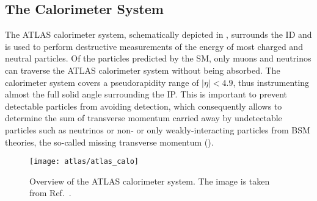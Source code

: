 \subsection{The Calorimeter System}%
\label{sec:atlas_calorimeters}


The ATLAS calorimeter system, schematically depicted in
, surrounds the ID and is used to perform
destructive measurements of the energy of most charged and neutral particles. Of
the particles predicted by the SM, only muons and neutrinos can traverse the
ATLAS calorimeter system without being absorbed. The calorimeter system covers a
pseudorapidity range of $|\eta| < 4.9$, thus instrumenting almost the full solid
angle surrounding the IP. This is important to prevent detectable particles from
avoiding detection, which consequently allows to determine the sum of transverse
momentum carried away by undetectable particles such as neutrinos or non- or
only weakly-interacting particles from BSM theories, the so-called missing
transverse momentum ().


\begin{figure}[htbp]
  \centering

  \texttt{[image: atlas/atlas\_calo]}

  \caption[Overview of the ATLAS calorimeter system.]{Overview of the ATLAS
    calorimeter system. The image is taken from Ref.~\cite{PERF-2007-01}.}%
  \label{fig:atlas_calorimeters}
\end{figure}

